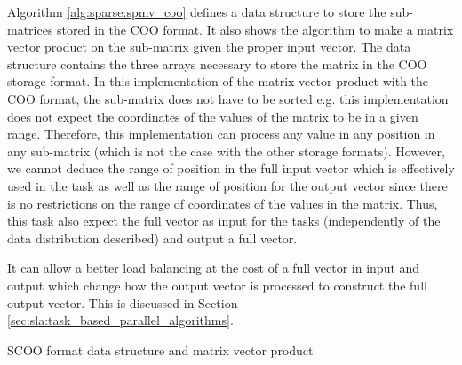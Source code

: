 Algorithm \ref{alg:sparse:spmv_coo} defines a data structure to store the sub-matrices stored in the COO format.
It also shows the algorithm to make a matrix vector product on the sub-matrix given the proper input vector.
The data structure contains the three arrays necessary to store the matrix in the COO storage format.
In this implementation of the matrix vector product with the COO format, the sub-matrix does not have to be sorted e.g. this implementation does not expect the coordinates of the values of the matrix to be in a given range.
Therefore, this implementation can process any value in any position in any sub-matrix (which is not the case with the other storage formats).
However, we cannot deduce the range of position in the full input vector which is effectively used in the task as well as the range of position for the output vector since there is no restrictions on the range of coordinates of the values in the matrix.
Thus, this task also expect the full vector as input for the tasks (independently of the data distribution described) and output a full vector.

It can allow a better load balancing at the cost of a full vector in input and output which change how the output vector is processed to construct the full output vector.
This is discussed in Section \ref{sec:sla:task_based_parallel_algorithms}.


\begin{algorithm}[h]
	\DontPrintSemicolon
	\SetAlgoVlined
	\caption{SCOO format data structure and matrix vector product\label{alg:sparse:spmv_scoo}}

	\;
\end{algorithm}

